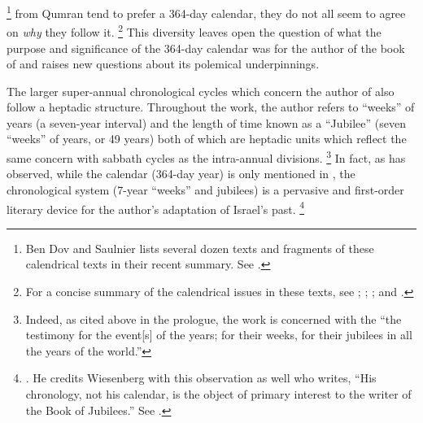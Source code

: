     \footnote{Ben Dov and Saulnier lists several dozen texts and fragments of these calendrical texts in their recent summary. See \cite[132--133]{bendov-saulnier_cbr2008}.}
from Qumran tend to prefer a 364-day calendar, they do not all seem to agree on \emph{why} they follow it.%
    \footnote{For a concise summary of the calendrical issues in these texts, see 
        \cite{vanderkam1998};
        \cite[233--268]{glessmer_flint-vanderkam1999};
        \cite[127--135]{bendov-saulnier_cbr2008}; and 
        \cite{jacobus_brooke-hempel2018}.}
This diversity leaves open the question of what the purpose and significance of the 364-day calendar was for the author of the book of \jub and raises new questions about its polemical underpinnings.

The larger super-annual chronological cycles which concern the author of \jub also follow a heptadic structure. Throughout the work, the author refers to ``weeks'' of years (a seven-year interval) and the length of time known as a ``Jubilee'' (seven ``weeks'' of years, or 49 years) both of which are heptadic units which reflect the same concern with sabbath cycles as the intra-annual divisions.%
    \footnote{Indeed, as cited above in the prologue, the work is concerned with the ``the testimony for the event[s] of the years; for their weeks, for their jubilees in all the years of the world.''}
In fact, as \vanderkam has observed, while the calendar (364-day year) is only mentioned in , the chronological system (7-year ``weeks'' and jubilees) is a pervasive and first-order literary device for the author's adaptation of Israel's past.%
    \footnote{\cite[522]{vanderkam-b_vanderkam2000}. He credits Wiesenberg with this observation as well who writes, ``His chronology, not his calendar, is the object of primary interest to the writer of the Book of Jubilees.'' See \cite[4]{wiesenberg_rev-qumran1961}.}

